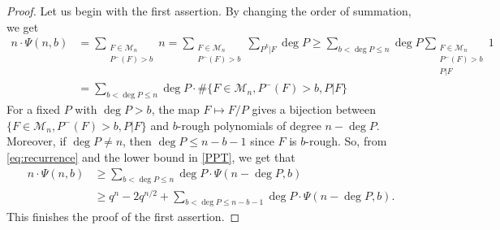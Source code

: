 \documentclass[12pt]{amsart}
\numberwithin{equation}{section}
\theoremstyle{definition}
\theoremstyle{remark}
\begin{document}
\begin{proof}
    Let us begin with the first assertion. By changing the order of summation, we get
    \begin{equation} \label{eq:recurrence}
    \begin{split}
        n \cdot \Psi(n,b) 
            &= \sum_{\substack{F \in \mathcal{M}_n \\ P^-(F) > b}} n 
            = \sum_{\substack{F \in \mathcal{M}_n \\ P^-(F) > b}} \sum_{P^k|F} \deg P  \geq \sum_{b<\deg P \leq n}  \deg P\sum_{\substack{F \in \mathcal{M}_n \\ P^-(F)>b \\ P|F}}1
            \\
            &
            = \sum_{b<\deg P \leq n}  \deg P \cdot \#\{F \in \mathcal{M}_n,P^-(F) >b,P|F\}
    \end{split}
    \end{equation}
    For a fixed $P$ with $\deg P > b$, the map $F\mapsto F/P$ gives a bijection between $\{F \in \mathcal{M}_n,P^-(F) >b,P|F\}$ and $b$-rough polynomials of degree $n-\deg P$. Moreover, if $\deg P \neq n$, then $\deg P \leq n-b-1$ since $F$ is $b$-rough. So, from \eqref{eq:recurrence} and the lower bound in \eqref{PPT}, we get that
    \[
    \begin{split}
        n \cdot \Psi(n,b) &\geq \sum_{b<\deg P \leq n} \deg P \cdot \Psi(n-\deg P, b) \\ &\geq q^n - 2q^{n/2} + \sum_{b<\deg P \leq n-b-1} \deg P \cdot \Psi(n-\deg P, b).
    \end{split}
    \]
    This finishes the proof of the first assertion.
    

\end{proof}
\end{document}
